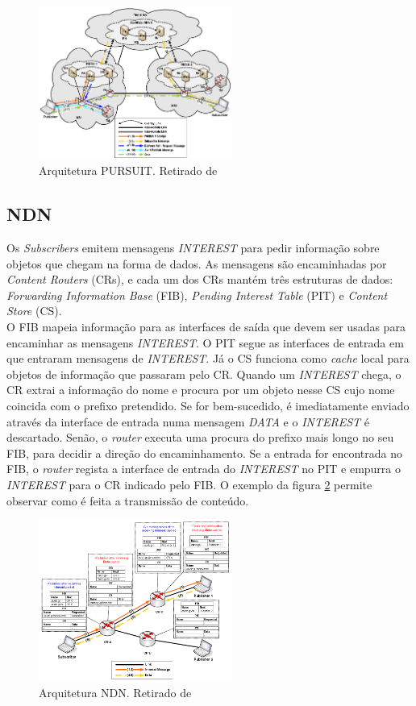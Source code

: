 \documentclass[conference]{IEEEtran}
\begin{document}
\begin{figure}[!t]
\centering
\includegraphics[width=2.5in]{pursuit}
\caption{Arquitetura PURSUIT. Retirado de \cite{surveyICN}}
\label{pursuit}
\end{figure}


\subsection{NDN}

Os \textit{Subscribers} emitem mensagens \textit{INTEREST} para pedir informa\c{c}\~{a}o sobre objetos que chegam na forma de dados. As mensagens s\~{a}o encaminhadas por \textit{Content Routers} (CRs), e cada um dos CRs mant\'{e}m tr\^{e}s estruturas de dados: \textit{Forwarding Information Base} (FIB), \textit{Pending Interest Table} (PIT) e \textit{Content Store} (CS). \\

O FIB mapeia informa\c{c}\~{a}o para as interfaces de sa\'{i}da que devem ser usadas para encaminhar as mensagens \textit{INTEREST}. O PIT segue as interfaces de entrada em que entraram mensagens de \textit{INTEREST}. J\'{a} o CS funciona como \textit{cache} local para objetos de informa\c{c}\~{a}o que passaram pelo CR. Quando um \textit{INTEREST} chega, o CR extrai a informa\c{c}\~{a}o do nome e procura por um objeto nesse CS cujo nome coincida com o prefixo pretendido. Se for bem-sucedido, \'{e} imediatamente enviado atrav\'{e}s da interface de entrada numa mensagem \textit{DATA} e o \textit{INTEREST} \'{e} descartado. Sen\~{a}o, o \textit{router} executa uma procura do prefixo mais longo no seu FIB, para decidir a dire\c{c}\~{a}o do encaminhamento. Se a entrada for encontrada no FIB, o \textit{router} regista a interface de entrada do \textit{INTEREST} no PIT e empurra o \textit{INTEREST} para o CR indicado pelo FIB. O exemplo da figura \ref{ndn} permite observar como \'{e} feita a transmiss\~{a}o de conte\'{u}do.\\

\begin{figure}[!t]
\centering
\includegraphics[width=2.5in]{ndn}
\caption{Arquitetura NDN. Retirado de \cite{surveyICN}}
\label{ndn}
\end{figure}
\end{document}
